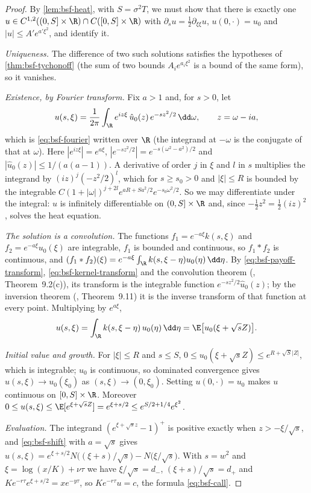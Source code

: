 \begin{proof}
By \cref{lem:bsf-heat}, with $S=\sigma^2T$, we must show that there is exactly one
$u\in C^{1,2}((0,S]\times\R)\cap C([0,S]\times\R)$ with $\partial_su=\frac12\partial_{\xi\xi}u$,
$u(0,\cdot)=u_0$ and $|u|\le A'e^{a'\xi^2}$, and identify it.

\emph{Uniqueness.} The difference of two such solutions satisfies the hypotheses of
\cref{thm:bsf-tychonoff} (the sum of two bounds $A_ie^{a_i\xi^2}$ is a bound of the same form), so it vanishes.

\emph{Existence, by Fourier transform.} Fix $a>1$ and, for $s>0$, let
\[
  u(s,\xi)=\frac{1}{2\pi}\int_\R e^{iz\xi}\,\hat u_0(z)\,e^{-sz^2/2}\,\dd\omega,\qquad z=\omega-ia,
\]
which is \eqref{eq:bsf-fourier} written over $\R$ (the integrand at $-\omega$ is the conjugate of that at
$\omega$). Here $|e^{iz\xi}|=e^{a\xi}$, $|e^{-sz^2/2}|=e^{-s(\omega^2-a^2)/2}$ and $|\hat u_0(z)|\le1/(a(a-1))$.
A derivative of order $j$ in $\xi$ and $l$ in $s$ multiplies the integrand by $(iz)^j(-z^2/2)^l$, which for
$s\ge s_0>0$ and $|\xi|\le R$ is bounded by the integrable $C(1+|\omega|)^{j+2l}e^{aR+Sa^2/2}e^{-s_0\omega^2/2}$.
So we may differentiate under the integral: $u$ is infinitely differentiable on $(0,S]\times\R$ and, since
$-\frac12z^2=\frac12(iz)^2$, solves the heat equation.

\emph{The solution is a convolution.} The functions $f_1=e^{-a\xi}k(s,\xi)$ and $f_2=e^{-a\xi}u_0(\xi)$ are
integrable, $f_1$ is bounded and continuous, so $f_1*f_2$ is continuous, and
$(f_1*f_2)(\xi)=e^{-a\xi}\int_\R k(s,\xi-\eta)u_0(\eta)\,\dd\eta$. By \eqref{eq:bsf-payoff-transform},
\eqref{eq:bsf-kernel-transform} and the convolution theorem (\textcite{rudin-rca}, Theorem~9.2(c)), its transform
is the integrable function $e^{-sz^2/2}\hat u_0(z)$; by the inversion theorem (\textcite{rudin-rca},
Theorem~9.11) it is the inverse transform of that function at every point. Multiplying by $e^{a\xi}$,
\begin{equation}\label{eq:bsf-convolution}
  u(s,\xi)=\int_\R k(s,\xi-\eta)\,u_0(\eta)\,\dd\eta=\E\big[u_0(\xi+\sqrt sZ)\big].
\end{equation}

\emph{Initial value and growth.} For $|\xi|\le R$ and $s\le S$, $0\le u_0(\xi+\sqrt sZ)\le e^{R+\sqrt S|Z|}$,
which is integrable; $u_0$ is continuous, so dominated convergence gives $u(s,\xi)\to u_0(\xi_0)$ as
$(s,\xi)\to(0,\xi_0)$. Setting $u(0,\cdot)=u_0$ makes $u$ continuous on $[0,S]\times\R$. Moreover
$0\le u(s,\xi)\le\E[e^{\xi+\sqrt sZ}]=e^{\xi+s/2}\le e^{S/2+1/4}e^{\xi^2}$.

\emph{Evaluation.} The integrand $(e^{\xi+\sqrt sz}-1)^+$ is positive exactly when $z>-\xi/\sqrt s$, and
\eqref{eq:bsf-shift} with $a=\sqrt s$ gives
$u(s,\xi)=e^{\xi+s/2}N\big((\xi+s)/\sqrt s\big)-N\big(\xi/\sqrt s\big)$. With $s=w^2$ and
$\xi=\log(x/K)+\nu\tau$ we have $\xi/\sqrt s=d_-$, $(\xi+s)/\sqrt s=d_+$ and
$Ke^{-r\tau}e^{\xi+s/2}=xe^{-y\tau}$, so $Ke^{-r\tau}u=c$, the formula \eqref{eq:bsf-call}.
\end{proof}


